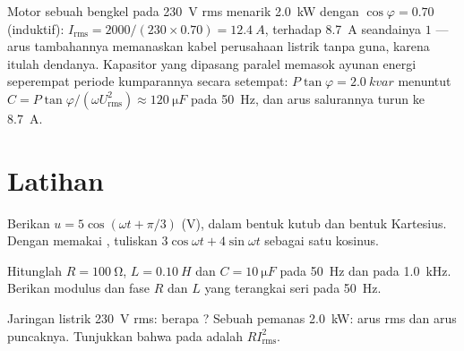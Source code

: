 \begin{example}\label{ex:b1:sinusoidal-impedance:pf}
Motor sebuah bengkel pada \qty{230}{V} rms menarik \qty{2.0}{kW} dengan
$\cos\varphi = 0.70$ (induktif): $I_{\mathrm{rms}} = 2000/(230 \times
0.70) = \qty{12.4}{A}$, terhadap \qty{8.7}{A} seandainya 
$1$ --- arus tambahannya memanaskan kabel perusahaan listrik tanpa
guna, karena itulah dendanya. Kapasitor yang dipasang paralel memasok
ayunan energi seperempat periode kumparannya secara setempat:
\emph{} $P\tan\varphi =
\qty{2.0}{kvar}$ menuntut $C = P\tan\varphi/(\omega U_{\mathrm{rms}}^2)
\approx \qty{120}{\micro F}$ pada \qty{50}{Hz}, dan arus salurannya turun
ke \qty{8.7}{A}.
\end{example}

\section{Latihan}

\begin{exercise}[$\star$]\label{exo:b1:sinusoidal-impedance:1}
Berikan  $u = 5\cos(\omega t + \pi/3)$ (V), dalam
bentuk kutub dan bentuk Kartesius. Dengan memakai ,
tuliskan $3\cos\omega t
+ 4\sin\omega t$ sebagai satu kosinus.
\end{exercise}

\begin{exercise}[$\star$]\label{exo:b1:sinusoidal-impedance:2}
Hitunglah  $R = \qty{100}{\ohm}$, $L = \qty{0.10}{H}$ dan
$C = \qty{10}{\micro F}$ pada \qty{50}{Hz} dan pada \qty{1.0}{kHz}.
Berikan modulus dan fase  $R$ dan $L$ yang terangkai seri pada
\qty{50}{Hz}.
\end{exercise}

\begin{exercise}[$\star$]\label{exo:b1:sinusoidal-impedance:3}
Jaringan listrik \qty{230}{V} rms: berapa ? Sebuah pemanas
\qty{2.0}{kW}: arus rms dan arus puncaknya. Tunjukkan bahwa  pada  adalah $RI_{\mathrm{rms}}^2$.
\end{exercise}

